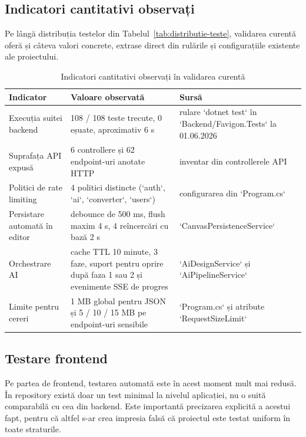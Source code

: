 \subsection{Indicatori cantitativi observați}

Pe lângă distribuția testelor din Tabelul~\ref{tab:distributie-teste}, validarea curentă oferă și câteva valori concrete, extrase direct din rulările și configurațiile existente ale proiectului.

\begin{table}[H]
  \centering
  \caption{Indicatori cantitativi observați în validarea curentă}
  \label{tab:indicatori-validare}
  \renewcommand{\arraystretch}{1.15}
  \begin{tabularx}{\textwidth}{>{\RaggedRight\arraybackslash}p{4.8cm}YY}
    \toprule
    \textbf{Indicator} & \textbf{Valoare observată} & \textbf{Sursă} \\
    \midrule
    Execuția suitei backend & 108 / 108 teste trecute, 0 eșuate, aproximativ 6 s & rulare `dotnet test` în `Backend/Favigon.Tests` la 01.06.2026 \\
    Suprafața API expusă & 6 controllere și 62 endpoint-uri anotate HTTP & inventar din controllerele API \\
    Politici de rate limiting & 4 politici distincte (`auth`, `ai`, `converter`, `users`) & configurarea din `Program.cs` \\
    Persistare automată în editor & debounce de 500 ms, flush maxim 4 s, 4 reîncercări cu bază 2 s & `CanvasPersistenceService` \\
    Orchestrare AI & cache TTL 10 minute, 3 faze, suport pentru oprire după faza 1 sau 2 și evenimente SSE de progres & `AiDesignService` și `AiPipelineService` \\
    Limite pentru cereri & 1 MB global pentru JSON și 5 / 10 / 15 MB pe endpoint-uri sensibile & `Program.cs` și atribute `RequestSizeLimit` \\
    \bottomrule
  \end{tabularx}
\end{table}

\subsection{Testare frontend}

Pe partea de frontend, testarea automată este în acest moment mult mai redusă. În repository există doar un test minimal la nivelul aplicației, nu o suită comparabilă cu cea din backend. Este importantă precizarea explicită a acestui fapt, pentru că altfel s-ar crea impresia falsă că proiectul este testat uniform în toate straturile.


